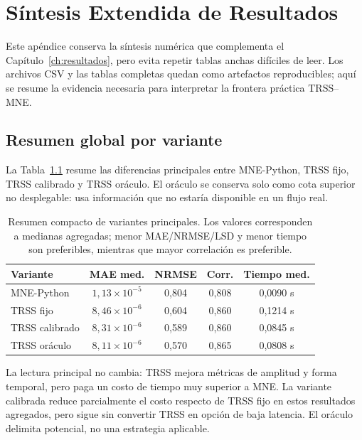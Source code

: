 \chapter{Síntesis Extendida de Resultados}
\label{ap:tablas_extensas}

Este apéndice conserva la síntesis numérica que complementa el Capítulo~\ref{ch:resultados}, pero evita repetir tablas anchas difíciles de leer. Los archivos CSV y las tablas completas quedan como artefactos reproducibles; aquí se resume la evidencia necesaria para interpretar la frontera práctica TRSS--MNE.

\section{Resumen global por variante}

La Tabla~\ref{tab:appendix_compact_global_summary} resume las diferencias principales entre MNE-Python, TRSS fijo, TRSS calibrado y TRSS oráculo. El oráculo se conserva solo como cota superior no desplegable: usa información que no estaría disponible en un flujo real.

\begin{table}[htbp]
\centering
\small
\caption{Resumen compacto de variantes principales. Los valores corresponden a medianas agregadas; menor MAE/NRMSE/LSD y menor tiempo son preferibles, mientras que mayor correlación es preferible.}
\label{tab:appendix_compact_global_summary}
\begin{tabular}{@{}lcccc@{}}
\toprule
Variante & MAE med. & NRMSE & Corr. & Tiempo med. \\
\midrule
MNE-Python & $1{,}13\times10^{-5}$ & 0{,}804 & 0{,}808 & 0{,}0090 s \\
TRSS fijo & $8{,}46\times10^{-6}$ & 0{,}604 & 0{,}860 & 0{,}1214 s \\
TRSS calibrado & $8{,}31\times10^{-6}$ & 0{,}589 & 0{,}860 & 0{,}0845 s \\
TRSS oráculo & $8{,}11\times10^{-6}$ & 0{,}570 & 0{,}865 & 0{,}0808 s \\
\bottomrule
\end{tabular}
\end{table}

La lectura principal no cambia: TRSS mejora métricas de amplitud y forma temporal, pero paga un costo de tiempo muy superior a MNE. La variante calibrada reduce parcialmente el costo respecto de TRSS fijo en estos resultados agregados, pero sigue sin convertir TRSS en opción de baja latencia. El oráculo delimita potencial, no una estrategia aplicable.

